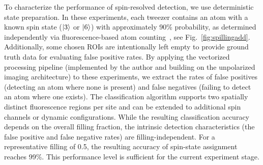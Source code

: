 To characterize the performance of spin-resolved detection, we use deterministic state preparation. In these experiments, each tweezer contains an atom with a known spin state ($\left| 3 \right\rangle$ or $\left| 6 \right\rangle$) with approximately 90\% probability, as determined independently via fluorescence-based atom counting~\cite{dux_optical_2023}, see Fig.~\ref{fig:spillingadd}. Additionally, some chosen ROIs are intentionally left empty to provide ground truth data for evaluating false positive rates. By applying the vectorized processing pipeline (implemented by the author and building on the unpolarized imaging architecture) to these experiments, we extract the rates of false positives (detecting an atom where none is present) and false negatives (failing to detect an atom where one exists). The classification algorithm supports two spatially distinct fluorescence regions per site and can be extended to additional spin channels or dynamic configurations. While the resulting classification accuracy depends on the overall filling fraction, the intrinsic detection characteristics (the false positive and false negative rates) are filling-independent. For a representative filling of 0.5, the resulting accuracy of spin-state assignment reaches 99\%. This performance level is sufficient for the current experiment stage.